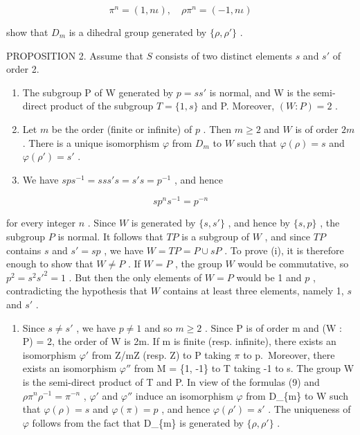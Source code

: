 \[
\pi^ {n} = (1, n \iota), \quad \rho \pi^ {n} = (- 1, n \iota)\tag{8}
\]

show that \(D_{m}\) is a dihedral group generated by \(\{\rho,\rho'\}\) .

PROPOSITION 2. Assume that \(S\) consists of two distinct elements \(s\) and \(s'\) of order 2.

\begin{enumerate}
\def\labelenumi{(\roman{enumi})}
\item
  The subgroup P of W generated by \(p = ss'\) is normal, and W is the semi-direct product of the subgroup \(T = \{1, s\}\) and P. Moreover, \((W : P) = 2\) .
\item
  Let \(m\) be the order (finite or infinite) of \(p\) . Then \(m \geqslant 2\) and \(W\) is of order \(2m\) . There is a unique isomorphism \(\varphi\) from \(D_m\) to \(W\) such that \(\varphi(\rho) = s\) and \(\varphi(\rho') = s'\) .
\item
  We have \(sps^{-1} = sss's = s's = p^{-1}\) , and hence
\end{enumerate}

\[
s p ^ {n} s ^ {- 1} = p ^ {- n}\tag{9}
\]

for every integer \(n\) . Since \(W\) is generated by \(\{s, s'\}\) , and hence by \(\{s, p\}\) , the subgroup \(P\) is normal. It follows that \(TP\) is a subgroup of \(W\) , and since \(TP\) contains \(s\) and \(s' = sp\) , we have \(W = TP = P \cup sP\) . To prove (i), it is therefore enough to show that \(W \neq P\) . If \(W = P\) , the group \(W\) would be commutative, so \(p^2 = s^2 s'^2 = 1\) . But then the only elements of \(W = P\) would be 1 and \(p\) , contradicting the hypothesis that \(W\) contains at least three elements, namely 1, \(s\) and \(s'\) .

\begin{enumerate}
\def\labelenumi{(\roman{enumi})}
\setcounter{enumi}{1}
\tightlist
\item
  Since \(s \neq s'\) , we have \(p \neq 1\) and so \(m \geqslant 2\) . Since P is of order m and (W : P) = 2, the order of W is 2m. If m is finite (resp. infinite), there exists an isomorphism \(\varphi'\) from Z/mZ (resp. Z) to P taking \(\pi\) to p.~Moreover, there exists an isomorphism \(\varphi''\) from M = \{1, -1\} to T taking -1 to s. The group W is the semi-direct product of T and P. In view of the formulas (9) and \(\rho\pi^{n}\rho^{-1} = \pi^{-n}\) , \(\varphi'\) and \(\varphi''\) induce an isomorphism \(\varphi\) from D\_\{m\} to W such that \(\varphi(\rho) = s\) and \(\varphi(\pi) = p\) , and hence \(\varphi(\rho') = s'\) . The uniqueness of \(\varphi\) follows from the fact that D\_\{m\} is generated by \(\{\rho, \rho'\}\) .
\end{enumerate}

